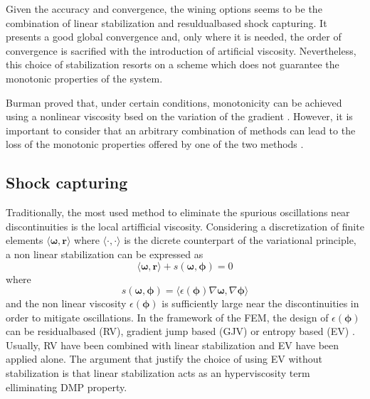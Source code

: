 Given the accuracy and convergence, the wining options seems to be the combination of linear stabilization and resuldualbased shock capturing. It presents a good global convergence and, only where it is needed, the order of convergence is sacrified with the introduction of artificial viscosity. Nevertheless, this choice of stabilization resorts on a scheme which does not guarantee the monotonic properties of the system.

Burman proved that, under certain conditions, monotonicity can be achieved using a nonlinear viscosity bsed on the variation of the gradient \cite{burman2007}. However, it is important to consider that an arbitrary combination of methods can lead to the loss of the monotonic properties offered by one of the two methods \cite{badia2014}.




\subsection{Shock capturing}


Traditionally, the most used method to eliminate the spurious oscillations near discontinuities is the local artifficial viscosity. Considering a discretization of finite elements $\langle\bm{\omega}, \mathbf{r}\rangle$ where $\langle \cdot,\cdot \rangle$ is the dicrete counterpart of the variational principle, a non linear stabilization can be expressed as
\begin{equation}
    \langle\bm{\omega}, \mathbf{r}\rangle + s(\bm{\omega}, \bm{\phi}) = 0
\end{equation}
where
\begin{equation}
    s(\bm{\omega}, \bm{\phi}) = \langle \epsilon(\bm\phi) \nabla\bm\omega , \nabla\bm\phi \rangle
\end{equation}
and the non linear viscosity $\epsilon(\bm\phi)$ is sufficiently large near the discontinuities in order to mitigate oscillations.
In the framework of the FEM, the design of $\epsilon(\bm\phi)$ can be residualbased (RV), gradient jump based (GJV) or entropy based (EV) \cite{guermond2011}.
Usually, RV have been combined with linear stabilization and EV have been applied alone. The argument that justify the choice of using EV without stabilization is that linear stabilization acts as an hyperviscosity term elliminating DMP property.

